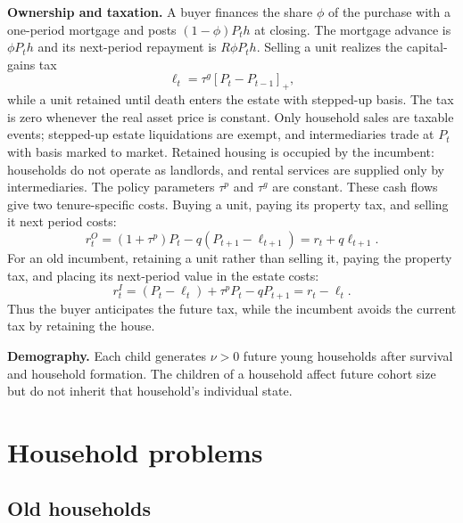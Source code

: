 \documentclass[10pt]{article}
\theoremstyle{definition}
\begin{document}
\textbf{Ownership and taxation.} A buyer finances the share $\phi$ of the
purchase with a one-period mortgage and posts $(1-\phi)P_th$ at closing. The
mortgage advance is $\phi P_th$ and its next-period repayment is
$R\phi P_th$. Selling a unit realizes the capital-gains tax
\begin{equation}
 \ell_t=\tau^g[P_t-P_{t-1}]_+,
 \label{eq:gains_tax}
\end{equation}
while a unit retained until death enters the estate with stepped-up basis. The
tax is zero whenever the real asset price is constant. Only household sales are
taxable events; stepped-up estate liquidations are exempt, and intermediaries
trade at $P_t$ with basis marked to market.
Retained housing is occupied by the incumbent: households do not operate as
landlords, and rental services are supplied only by intermediaries. The policy
parameters $\tau^p$ and $\tau^g$ are constant. These cash flows give two
tenure-specific costs. Buying a unit, paying its
property tax, and selling it next period costs:
\begin{equation}
 r_t^O=(1+\tau^p)P_t-q(P_{t+1}-\ell_{t+1})
 =r_t+q\ell_{t+1}.
 \label{eq:owner_user_cost}
\end{equation}
For an old incumbent, retaining a unit rather than selling it, paying the
property tax, and placing its next-period value in the estate costs:
\begin{equation}
 r_t^I=(P_t-\ell_t)+\tau^pP_t-qP_{t+1}=r_t-\ell_t.
 \label{eq:incumbent_user_cost}
\end{equation}
Thus the buyer anticipates the future tax, while the incumbent avoids the
current tax by retaining the house.

\textbf{Demography.} Each child generates $\nu>0$ future young households
after survival and household formation. The children of a household affect
future cohort size but do not inherit that household's individual state.

\section{Household problems}

\subsection{Old households}
\end{document}
